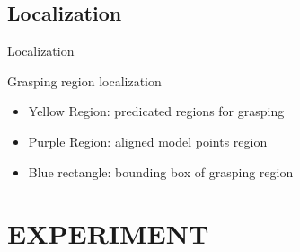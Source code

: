 \documentclass[xcolor=table,compress,blue]{beamer}
\begin{document}
\subsection{Localization}
\begin{frame}{Localization}
	\begin{exampleblock}{Grasping region localization}
		\begin{itemize}
		\item \footnotesize{Yellow Region: predicated regions for grasping }
		\item \footnotesize{Purple Region: aligned model points region }
		\item \footnotesize{Blue rectangle: bounding box of grasping region }
		\end{itemize}
	\end{exampleblock}
\end{frame}



\section{EXPERIMENT}
\end{document}
